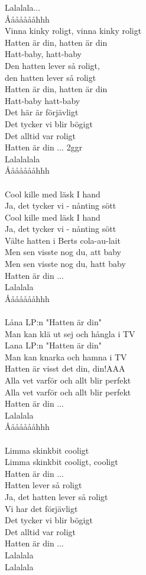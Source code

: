 \vspace{10pt}
Lalalala...\\
Åååååååhhh\\
Vinna kinky roligt, vinna kinky roligt\\
Hatten är din, hatten är din\\
Hatt-baby, hatt-baby\\
Den hatten lever så roligt,\\
den hatten lever så roligt\\
Hatten är din, hatten är din\\
Hatt-baby hatt-baby\\
Det här är förjävligt\\
Det tycker vi blir bögigt\\
Det alltid var roligt\\
Hatten är din ... 2ggr\\
Lalalalala\\
Åååååååhhh\\
\\
Cool kille med läsk I hand\\
Ja, det tycker vi - nånting sött\\
Cool kille med läsk I hand\\
Ja, det tycker vi - nånting sött\\
\revrpt Välte hatten i Berts cola-au-lait \rpt \\
\revrpt Men sen visste nog du, att baby \rpt \\
\revrpt Men sen visste nog du, hatt baby \rpt \\
Hatten är din ...\\
Lalalala\\
Åååååååhhh\\
\\
Låna LP:n "Hatten är din"\\
Man kan klä ut sej och hångla i TV\\
Lana LP:n "Hatten är din"\\
Man kan knarka och hamna i TV\\
\revrpt Hatten är visst det din, din!AAA \rpt \\
\revrpt Alla vet varför och allt blir perfekt \\
Alla vet varför och allt blir perfekt \rpt \\
Hatten är din ... \\
Lalalala\\
Åååååååhhh\\
\\
Limma skinkbit cooligt\\
Limma skinkbit cooligt, cooligt\\
Hatten är din ...\\
\revrpt Hatten lever så roligt \rpt \\
Ja, det hatten lever så roligt\\
Vi har det förjävligt\\
Det tycker vi blir bögigt\\
Det alltid var roligt\\
\revrpt Hatten är din ... \rpt \\
Lalalala\\
Lalalala